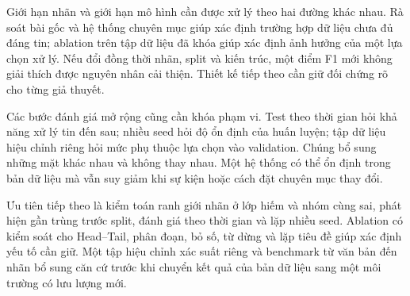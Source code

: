 Giới hạn nhãn và giới hạn mô hình cần được xử lý theo hai đường khác nhau. Rà soát bài gốc và hệ thống chuyên mục giúp xác định trường hợp dữ liệu chưa đủ đáng tin; ablation trên tập dữ liệu đã khóa giúp xác định ảnh hưởng của một lựa chọn xử lý. Nếu đổi đồng thời nhãn, split và kiến trúc, một điểm F1 mới không giải thích được nguyên nhân cải thiện. Thiết kế tiếp theo cần giữ đối chứng rõ cho từng giả thuyết.

Các bước đánh giá mở rộng cũng cần khóa phạm vi. Test theo thời gian hỏi khả năng xử lý tin đến sau; nhiều seed hỏi độ ổn định của huấn luyện; tập dữ liệu hiệu chỉnh riêng hỏi mức phụ thuộc lựa chọn vào validation. Chúng bổ sung những mặt khác nhau và không thay nhau. Một hệ thống có thể ổn định trong bản dữ liệu mà vẫn suy giảm khi sự kiện hoặc cách đặt chuyên mục thay đổi.


Ưu tiên tiếp theo là kiểm toán ranh giới nhãn ở lớp hiếm và nhóm cùng sai, phát hiện gần trùng trước split, đánh giá theo thời gian và lặp nhiều seed. Ablation có kiểm soát cho Head--Tail, phân đoạn, bỏ số, từ dừng và lặp tiêu đề giúp xác định yếu tố cần giữ. Một tập hiệu chỉnh xác suất riêng và benchmark từ văn bản đến nhãn bổ sung căn cứ trước khi chuyển kết quả của bản dữ liệu sang một môi trường có lưu lượng mới.
